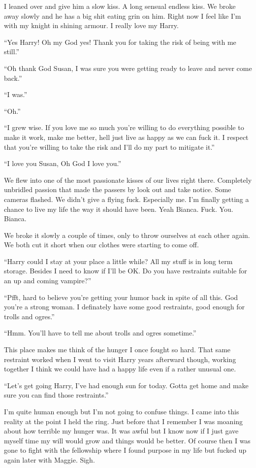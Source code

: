 I leaned over and give him a slow kiss. A long sensual endless kiss. We broke away slowly and he has a big shit eating grin on him. Right now I feel like I'm with my knight in shining armour. I really love my Harry.

``Yes Harry! Oh my God yes! Thank you for taking the risk of being with me still.''

``Oh thank God Susan, I was sure you were getting ready to leave and never come back.''

``I was.''

``Oh.''

``I grew wise. If you love me so much you're willing to do everything possible to make it work, make me better, hell just live as happy as we can fuck it. I respect that you're willing to take the risk and I'll do my part to mitigate it.''

``I love you Susan, Oh God I love you.''

We flew into one of the most passionate kisses of our lives right there. Completely unbridled passion that made the passers by look out and take notice. Some cameras flashed. We didn't give a flying fuck. Especially me. I'm finally getting a chance to live my life the way it should have been. Yeah Bianca. Fuck. You. Bianca.

We broke it slowly a couple of times, only to throw ourselves at each other again. We both cut it short when our clothes were starting to come off.

``Harry could I stay at your place a little while? All my stuff is in long term storage. Besides I need to know if I'll be OK. Do you have restraints suitable for an up and coming vampire?''

``Pfft, hard to believe you're getting your humor back in spite of all this. God you're a strong woman. I definately have some good restraints, good enough for trolls and ogres.''

``Hmm. You'll have to tell me about trolls and ogres sometime.'' 

This place makes me think of the hunger I once fought so hard. That same restraint worked when I went to visit Harry years afterward though, working together I think we could have had a happy life even if a rather unusual one.

``Let's get going Harry, I've had enough sun for today. Gotta get home and make sure you can find those restraints.''

I'm quite human enough but I'm not going to confuse things. I came into this reality at the point I held the ring. Just before that I remember I was moaning about how terrible my hunger was. It was awful but I know now if I just gave myself time my will would grow and things would be better. Of course then I was gone to fight with the fellowship where I found purpose in my life but fucked up again later with Maggie. Sigh.

